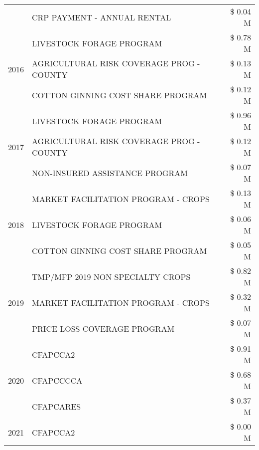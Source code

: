 \begin{tabular}{llr}
 & CRP PAYMENT - ANNUAL RENTAL & \$ 0.04 M \\
\cline{1-3}
\multirow[t]{3}{*}{2016} & LIVESTOCK FORAGE PROGRAM                      & \$ 0.78 M \\
 & AGRICULTURAL RISK COVERAGE PROG - COUNTY      & \$ 0.13 M \\
 & COTTON GINNING COST SHARE PROGRAM             & \$ 0.12 M \\
\cline{1-3}
\multirow[t]{3}{*}{2017} & LIVESTOCK FORAGE PROGRAM & \$ 0.96 M \\
 & AGRICULTURAL RISK COVERAGE PROG - COUNTY & \$ 0.12 M \\
 & NON-INSURED ASSISTANCE PROGRAM & \$ 0.07 M \\
\cline{1-3}
\multirow[t]{3}{*}{2018} & MARKET FACILITATION PROGRAM - CROPS & \$ 0.13 M \\
 & LIVESTOCK FORAGE PROGRAM & \$ 0.06 M \\
 & COTTON GINNING COST SHARE PROGRAM & \$ 0.05 M \\
\cline{1-3}
\multirow[t]{3}{*}{2019} & TMP/MFP 2019 NON SPECIALTY CROPS & \$ 0.82 M \\
 & MARKET FACILITATION PROGRAM - CROPS & \$ 0.32 M \\
 & PRICE LOSS COVERAGE PROGRAM & \$ 0.07 M \\
\cline{1-3}
\multirow[t]{3}{*}{2020} & CFAPCCA2 & \$ 0.91 M \\
 & CFAPCCCCA & \$ 0.68 M \\
 & CFAPCARES & \$ 0.37 M \\
\cline{1-3}
2021 & CFAPCCA2 & \$ 0.00 M \\
\cline{1-3}
\bottomrule
\end{tabular}
